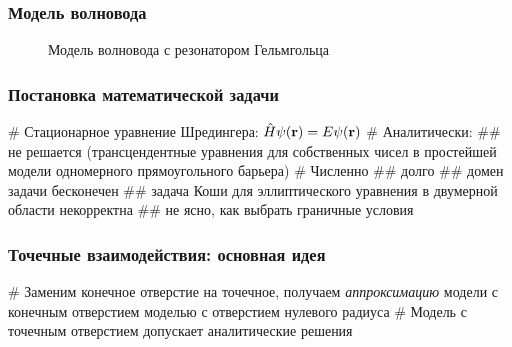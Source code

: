 \documentclass{beamer}
\begin{document}
\begin{frame}[fragile]
\frametitle{Модель волновода}
\begin{figure}
\begin{tikzpicture}[scale=0.5]

\end{tikzpicture}
\caption{Модель волновода с резонатором Гельмгольца}
\end{figure}
\end{frame}

\begin{frame}[fragile]
\frametitle{Постановка математической задачи}
\begin{easylist}[itemize]
# Стационарное уравнение Шредингера: $\hat{H} \psi(\vb{r}) = E \psi(\vb{r})$
# Аналитически:
## не решается (трансцендентные уравнения для собственных чисел в простейшей модели одномерного прямоугольного барьера)
# Численно
## долго
## домен задачи бесконечен
## задача Коши для эллиптического уравнения в двумерной области некорректна
## не ясно, как выбрать граничные условия
\end{easylist}
\end{frame}



\begin{frame}[fragile]
\frametitle{Точечные взаимодействия: основная идея}
\begin{easylist}[itemize]
# Заменим конечное отверстие на точечное, получаем \textit{аппроксимацию} модели с конечным отверстием моделью с отверстием нулевого радиуса
# Модель с точечным отверстием допускает аналитические решения
\end{easylist}
\end{frame}
\end{document}
